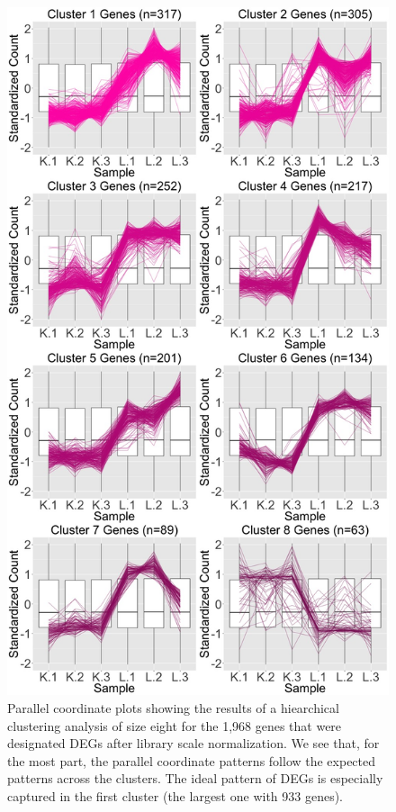 \documentclass{article}
\begin{document}
\begin{figure}[!p]
\centerline{\includegraphics[width=1\columnwidth]{../Bioinformatics/Pictures/liverKidney/Clustering_data_FDR_001_TMMvRaw_Add/K_L_8.jpg}}
\caption{Parallel coordinate plots showing the results of a hiearchical clustering analysis of size eight for the 1,968 genes that were designated DEGs after library scale normalization. We see that, for the most part, the parallel coordinate patterns follow the expected patterns across the clusters. The ideal pattern of DEGs is especially captured in the first cluster (the largest one with 933 genes).
\label{AddPCP}}
\end{figure}
\end{document}
